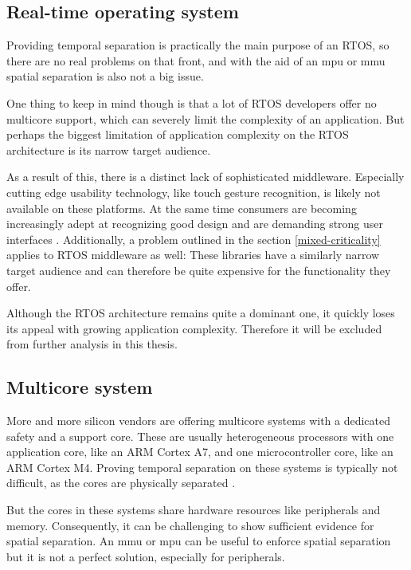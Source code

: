 \subsection{Real-time operating system}
Providing temporal separation is practically the main purpose of an RTOS, so there are no real problems on that front, and with the aid of an \acrshort{mpu} or \acrshort{mmu} spatial separation is also not a big issue.

One thing to keep in mind though is that a lot of RTOS developers offer no multicore support, which can severely limit the complexity of an application. But perhaps the biggest limitation of application complexity on the RTOS architecture is its narrow target audience.

As a result of this, there is a distinct lack of sophisticated middleware. Especially cutting edge usability technology, like touch gesture recognition, is likely not available on these platforms. At the same time consumers are becoming increasingly adept at recognizing good design and are demanding strong user interfaces \cite{HBR.September2015}.
Additionally, a problem outlined in the section \ref{mixed-criticality} applies to RTOS middleware as well: These libraries have a similarly narrow target audience and can therefore be quite expensive for the functionality they offer.

Although the RTOS architecture remains quite a dominant one, it quickly loses its appeal with growing application complexity. Therefore it will be excluded from further analysis in this thesis.
\subsection{Multicore system}
More and more silicon vendors are offering multicore systems with a dedicated safety and a support core. These are usually heterogeneous processors with one application core, like an ARM Cortex A7, and one microcontroller core, like an ARM Cortex M4. Proving temporal separation on these systems is typically not difficult, as the cores are physically separated \cite{Wittenstein.temporal.2017}.

But the cores in these systems share hardware resources like peripherals and memory. Consequently, it can be challenging to show sufficient evidence for spatial separation. An \acrshort{mmu} or \acrshort{mpu} can be useful to enforce spatial separation but it is not a perfect solution, especially for peripherals.
